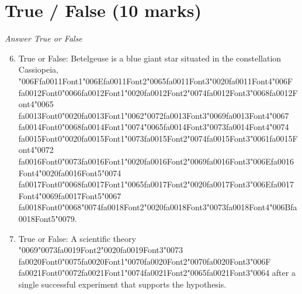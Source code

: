 \documentclass[12pt]{article}
\begin{document}
\section*{True / False (10 marks)}
\textit{Answer True or False}
\begin{enumerate}[label=\arabic*.]
\setcounter{enumi}{5}
\item True or False: Betelgeuse is a blue giant star situated in the constellation Cassiopeia, {\char"006F}{\csname fa0011Font1\endcsname\char"006E}{\csname fa0011Font2\endcsname\char"0065}{\csname fa0011Font3\endcsname\char"0020}{\csname fa0011Font4\endcsname\char"006F} {\csname fa0012Font0\endcsname\char"0066}{\csname fa0012Font1\endcsname\char"0020}{\csname fa0012Font2\endcsname\char"0074}{\csname fa0012Font3\endcsname\char"0068}{\csname fa0012Font4\endcsname\char"0065} {\csname fa0013Font0\endcsname\char"0020}{\csname fa0013Font1\endcsname\char"0062}{\char"0072}{\csname fa0013Font3\endcsname\char"0069}{\csname fa0013Font4\endcsname\char"0067} {\csname fa0014Font0\endcsname\char"0068}{\csname fa0014Font1\endcsname\char"0074}{\char"0065}{\csname fa0014Font3\endcsname\char"0073}{\csname fa0014Font4\endcsname\char"0074} {\csname fa0015Font0\endcsname\char"0020}{\csname fa0015Font1\endcsname\char"0073}{\csname fa0015Font2\endcsname\char"0074}{\csname fa0015Font3\endcsname\char"0061}{\csname fa0015Font4\endcsname\char"0072} {\csname fa0016Font0\endcsname\char"0073}{\csname fa0016Font1\endcsname\char"0020}{\csname fa0016Font2\endcsname\char"0069}{\csname fa0016Font3\endcsname\char"006E}{\csname fa0016Font4\endcsname\char"0020}{\csname fa0016Font5\endcsname\char"0074} {\csname fa0017Font0\endcsname\char"0068}{\csname fa0017Font1\endcsname\char"0065}{\csname fa0017Font2\endcsname\char"0020}{\csname fa0017Font3\endcsname\char"006E}{\csname fa0017Font4\endcsname\char"0069}{\csname fa0017Font5\endcsname\char"0067} {\csname fa0018Font0\endcsname\char"0068}{\char"0074}{\csname fa0018Font2\endcsname\char"0020}{\csname fa0018Font3\endcsname\char"0073}{\csname fa0018Font4\endcsname\char"006B}{\csname fa0018Font5\endcsname\char"0079}.
\item True or False: A scientific theory {\char"0069}{\char"0073}{\csname fa0019Font2\endcsname\char"0020}{\csname fa0019Font3\endcsname\char"0073} {\csname fa0020Font0\endcsname\char"0075}{\csname fa0020Font1\endcsname\char"0070}{\csname fa0020Font2\endcsname\char"0070}{\csname fa0020Font3\endcsname\char"006F} {\csname fa0021Font0\endcsname\char"0072}{\csname fa0021Font1\endcsname\char"0074}{\csname fa0021Font2\endcsname\char"0065}{\csname fa0021Font3\endcsname\char"0064} after a single successful experiment that supports the hypothesis.

\end{enumerate}
\end{document}
